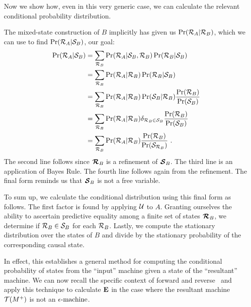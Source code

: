 Now we show how, even in this very generic case, we can calculate the relevant
conditional probability distribution.

The mixed-state construction of $B$ implicitly has given us
$\Pr(\mathcal{R}_A | \mathcal{R}_B)$, which we can use to
find $\Pr(\mathcal{R}_A | \mathcal{S}_B)$, our goal:
\begin{align*}
\Pr(\mathcal{R}_A | \mathcal{S}_B)
  &= \sum_{\mathcal{R}_B}
  	\Pr(\mathcal{R}_A | \mathcal{S}_B, \mathcal{R}_B)
	\Pr(\mathcal{R}_B | \mathcal{S}_B) \\
  &= \sum_{\mathcal{R}_B}
  	\Pr(\mathcal{R}_A | \mathcal{R}_B)
	\Pr(\mathcal{R}_B | \mathcal{S}_B) \\
  &= \sum_{\mathcal{R}_B}
  	\Pr(\mathcal{R}_A | \mathcal{R}_B)
	\Pr(\mathcal{S}_B | \mathcal{R}_B)
	\frac{\Pr(\mathcal{R}_B)}{\Pr(\mathcal{S}_B)} \\
  &= \sum_{\mathcal{R}_B}
  	\Pr(\mathcal{R}_A | \mathcal{R}_B)
	\delta_{\mathcal{R}_B \in \mathcal{S}_B}
	\frac{\Pr(\mathcal{R}_B)}{\Pr(\mathcal{S}_B)} \\
  &= \sum_{\mathcal{R}_B}
  	\Pr(\mathcal{R}_A | \mathcal{R}_B)
	\frac{\Pr(\mathcal{R}_B)}{\Pr(\mathcal{S}_{\mathcal{R}_B})} ~.
\end{align*}
The second line follows since $\boldsymbol{\mathcal{R}}_B$ is a refinement of
$\boldsymbol{\mathcal{S}}_B$. The third line is an application of Bayes Rule. The
fourth line follows again from the refinement. The final form reminds us that
$\boldsymbol{\mathcal{S}}_B$ is not a free variable.

To sum up, we calculate the conditional distribution using this final form as
follows. The first factor is found by applying $\mathcal{U}$ to $A$. Granting
ourselves the ability to ascertain predictive equality among a finite set of
states $\boldsymbol{\mathcal{R}}_B$, we determine if
$\mathcal{R}_B \in \mathcal{S}_B$ for each $\mathcal{R}_B$. Lastly,
we compute the stationary distribution over the states of $B$ and divide by
the stationary probability of the corresponding causal state.

In effect, this establishes a general method for computing the conditional
probability of states from the ``input'' machine given a state of the
``resultant'' machine. We can now recall the specific context of forward
and reverse \eMs\ and apply this technique to calculate ${\bf E}$ in the case
where the resultant machine $\mathcal{T}({M}^{+})$ is not an $\mbox{$\epsilon$-machine}$.

